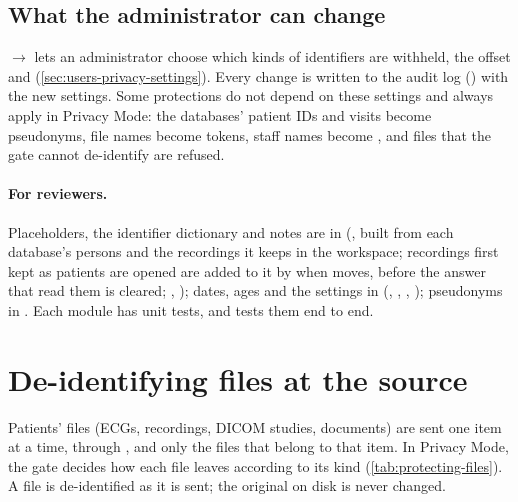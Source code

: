 \subsection{What the administrator can change}
\label{sec:protecting-settings}

 $\rightarrow$  lets an administrator choose which kinds of identifiers
are withheld, the offset and  (\cref{sec:users-privacy-settings}).
Every change is written to the audit log () with the new settings. Some
protections do not depend on these settings and always apply in Privacy Mode: the databases'
patient IDs and visits become pseudonyms, file names become tokens, staff names become
, and files that the gate cannot de-identify are refused.

\paragraph{For reviewers.} Placeholders, the identifier dictionary and notes are in
 (, built from each database's persons and the recordings it keeps
in the workspace; recordings first kept as patients are opened are added to it by
 when  moves, before the answer
that read them is cleared; , ); dates, ages and the settings in  (,
, , ); pseudonyms in .
Each module has unit tests, and  tests them end to end.

\section{De-identifying files at the source}
\label{sec:protecting-files}

Patients' files (ECGs, recordings, DICOM studies, documents) are sent one item at a time, through
, and only the files that belong to that item. In Privacy
Mode, the gate decides how each file leaves according to its kind
(\cref{tab:protecting-files}). A file is de-identified as it is sent; the original on disk is
never changed.

